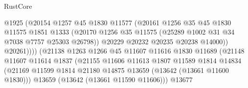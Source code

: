 \begin{lexlean}{RustCore}
\begin{coremodule}
                                        @1925
                                        (@20154
                                          @1257
                                          @45
                                          @1830
                                          @11577
                                          (@20161
                                            @1256
                                            @35
                                            @45
                                            @1830
                                            @11575
                                            @1851
                                            @1333
                                            (@20170
                                              @1256
                                              @35
                                              @11575
                                              (@25289 @1002 @31 @34 @7038 @7757 @25303 @26798))
                                            @20229
                                            @20232
                                            @20235
                                            @20238
                                            @14000))
                                        @20261))))
                                (@21138
                                  @1263
                                  @1266
                                  @45
                                  @11607
                                  @11616
                                  @1830
                                  @11689
                                  (@21148
                                    @11607
                                    @11614
                                    @1837
                                    (@21155
                                      @11606
                                      @11613
                                      @1807
                                      @11589
                                      @1814
                                      @14834
                                      (@21169
                                        @11599
                                        @1814
                                        @21180
                                        @14875
                                        @13659
                                        (@13642 (@13661 @11600 @1830)))
                                      @13659
                                      (@13642 (@13661 @11590 @11606)))
                                    @13677

\end{coremodule}
\end{lexlean}
